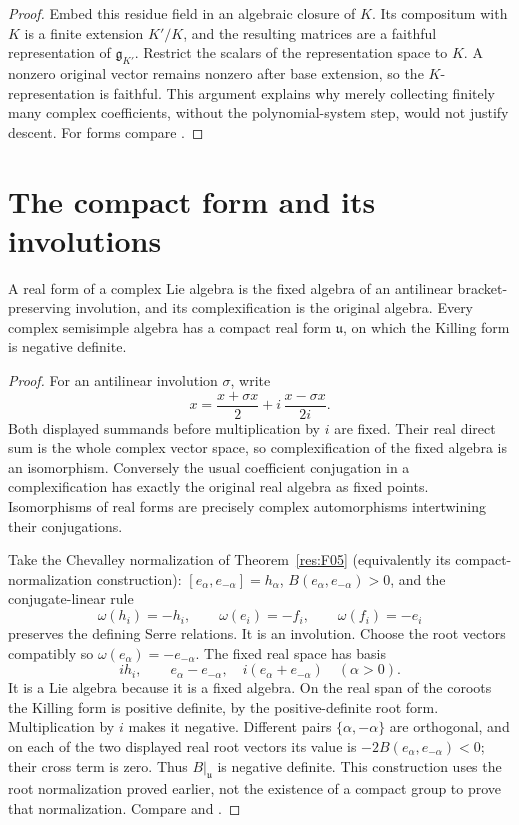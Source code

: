 \begin{proof}
Embed this residue field in an algebraic closure of \(K\).
Its compositum with \(K\) is a finite extension \(K'/K\), and
the resulting matrices are a faithful representation of
\(\mathfrak g_{K'}\). Restrict the scalars of the representation
space to \(K\). A nonzero original vector remains nonzero after
base extension, so the \(K\)-representation is faithful.
This argument explains why merely collecting finitely many
complex coefficients, without the polynomial-system step,
would not justify descent.
For forms compare \cite[Proposition 40.4]{etingof}.
\end{proof}

\section{The compact form and its involutions}

\begin{theorem}\label{res:J03}
A real form of a complex Lie algebra is the fixed algebra of an
antilinear bracket-preserving involution, and its complexification
is the original algebra. Every complex semisimple algebra has
a compact real form \(\mathfrak u\), on which the Killing form
is negative definite.
\end{theorem}
\begin{proof}
For an antilinear involution \(\sigma\), write
\[
 x=\frac{x+\sigma x}{2}
   +i\,\frac{x-\sigma x}{2i}.
\]
Both displayed summands before multiplication by \(i\) are fixed.
Their real direct sum is the whole complex vector space,
so complexification of the fixed algebra is an isomorphism.
Conversely the usual coefficient conjugation in a complexification
has exactly the original real algebra as fixed points.
Isomorphisms of real forms are precisely complex automorphisms
intertwining their conjugations.

Take the Chevalley normalization of Theorem~\ref{res:F05}
(equivalently its compact-normalization construction):
\([e_\alpha,e_{-\alpha}]=h_\alpha\),
\(B(e_\alpha,e_{-\alpha})>0\), and the conjugate-linear rule
\[
 \omega(h_i)=-h_i,\qquad
 \omega(e_i)=-f_i,\qquad \omega(f_i)=-e_i
\]
preserves the defining Serre relations. It is an involution.
Choose the root vectors compatibly so
\(\omega(e_\alpha)=-e_{-\alpha}\).
The fixed real space has basis
\[
 ih_i,\qquad
 e_\alpha-e_{-\alpha},\quad i(e_\alpha+e_{-\alpha})
 \quad(\alpha>0).
\]
It is a Lie algebra because it is a fixed algebra.
On the real span of the coroots the Killing form is positive
definite, by the positive-definite root form. Multiplication by
\(i\) makes it negative. Different pairs
\(\{\alpha,-\alpha\}\) are orthogonal, and on each of the two
displayed real root vectors its value is
\(-2B(e_\alpha,e_{-\alpha})<0\); their cross term is zero.
Thus \(B|_{\mathfrak u}\) is negative definite.
This construction uses the root normalization proved earlier,
not the existence of a compact group to prove that normalization.
Compare \cite[Proposition 41.1]{etingof} and
\cite[Section VI.1]{knapp}.
\end{proof}


